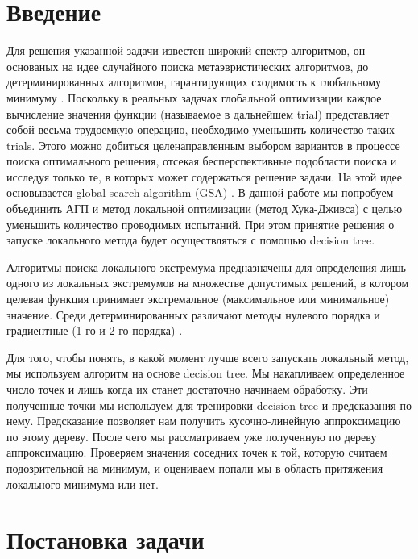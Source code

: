 \documentclass{svproc}
\begin{document}
\section{Введение}

Для решения указанной задачи известен широкий спектр алгоритмов, он основаных на идее случайного поиска \cite{fio_bib1, fio_bib2, fio_bib3} метаэвристических алгоритмов, до детерминированных алгоритмов, гарантирующих сходимость к глобальному минимуму \cite{fio_bib4, fio_bib5, fio_bib6}. 
Поскольку в реальных задачах глобальной оптимизации каждое вычисление значения функции (называемое в дальнейшем trial) представляет собой весьма трудоемкую операцию, необходимо уменьшить количество таких trials. Этого можно добиться целенаправленным выбором вариантов в процессе поиска оптимального решения, отсекая бесперспективные подобласти поиска и исследуя только те, в которых может содержаться решение задачи. На этой идее основывается global search algorithm (GSA) \cite{fio_bib7}. В данной работе мы попробуем объединить АГП и метод локальной оптимизации (метод Хука-Дживса) с целью уменьшить количество проводимых испытаний. При этом принятие решения о запуске локального метода будет осуществляться с помощью decision tree.

Алгоритмы поиска локального экстремума предназначены для определения лишь одного из локальных экстремумов на множестве допустимых решений, в котором целевая функция принимает экстремальное (максимальное или минимальное) значение. 
Среди детерминированных различают методы нулевого порядка и градиентные (1-го и 2-го порядка) \cite{fio_bib8, fio_bib9}.

Для того, чтобы понять, в какой момент лучше всего запускать локальный метод, мы используем алгоритм на основе decision tree. Мы накапливаем определенное число точек и лишь когда их станет достаточно начинаем обработку. Эти полученные точки мы используем для тренировки decision tree и предсказания по нему. Предсказание позволяет нам получить кусочно-линейную аппроксимацию по этому дереву. После чего мы рассматриваем уже полученную по дереву аппроксимацию. Проверяем значения соседних точек к той, которую считаем подозрительной на минимум, и оцениваем попали мы в область притяжения локального минимума или нет. 

\section{Постановка задачи}
\end{document}
